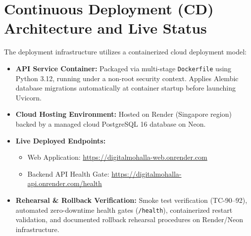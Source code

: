 \section{Continuous Deployment (CD) Architecture and Live Status}
The deployment infrastructure utilizes a containerized cloud deployment model:
\begin{itemize}
    \item \textbf{API Service Container:} Packaged via multi-stage \texttt{Dockerfile} using Python 3.12, running under a non-root security context. Applies Alembic database migrations automatically at container startup before launching Uvicorn.
    \item \textbf{Cloud Hosting Environment:} Hosted on Render (Singapore region) backed by a managed cloud PostgreSQL 16 database on Neon.
    \item \textbf{Live Deployed Endpoints:}
    \begin{itemize}
        \item Web Application: \url{https://digitalmohalla-web.onrender.com}
        \item Backend API Health Gate: \url{https://digitalmohalla-api.onrender.com/health}
    \end{itemize}
    \item \textbf{Rehearsal \& Rollback Verification:} Smoke test verification (TC-90--92), automated zero-downtime health gates (\texttt{/health}), containerized restart validation, and documented rollback rehearsal procedures on Render/Neon infrastructure.
\end{itemize}

